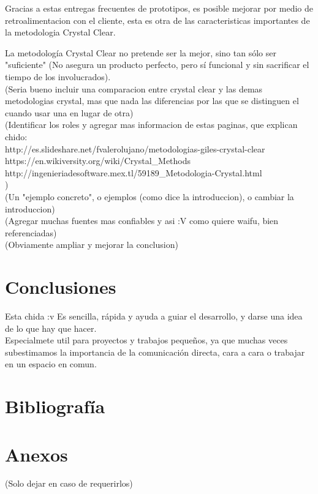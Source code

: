 \documentclass[12pt,a4paper]{article}
\begin{document}
	Gracias a estas entregas frecuentes de prototipos, es posible mejorar por medio de retroalimentacion con el cliente, esta es otra de las caracteristicas importantes de la metodologia Crystal Clear.
	
	La metodolog\'ia Crystal Clear no pretende ser la mejor, sino tan s\'olo ser "suficiente" (No asegura un producto perfecto, pero sí funcional y sin sacrificar el tiempo de los involucrados).\\
	
	(Seria bueno incluir una comparacion entre crystal clear y las demas metodologias crystal, mas que nada las diferencias por las que se distinguen el cuando usar una en lugar de otra)\\
	
	(Identificar los roles y agregar mas informacion de estas paginas, que explican chido:\\
	http://es.slideshare.net/fvalerolujano/metodologias-giles-crystal-clear \\
	https://en.wikiversity.org/wiki/Crystal\_Methods \\
	http://ingenieriadesoftware.mex.tl/59189\_Metodologia-Crystal.html \\
	)\\
	
	(Un "ejemplo concreto", o ejemplos (como dice la introduccion), o cambiar la introduccion)\\
	
	(Agregar muchas fuentes mas confiables y asi :V como quiere waifu, bien referenciadas)\\
	
	(Obviamente ampliar y mejorar la conclusion)\\
	
	\section{Conclusiones}
	Esta chida :v Es sencilla, rápida y ayuda a guiar el desarrollo, y darse una idea de lo que hay que hacer.\\
	Especialmete util para proyectos y trabajos pequeños, ya que muchas veces subestimamos la importancia de la comunicación directa, cara a cara o trabajar en un espacio en comun.\\
	
	\section{Bibliografía}
	
	\section{Anexos}
	(Solo dejar en caso de requerirlos)
\end{document}
